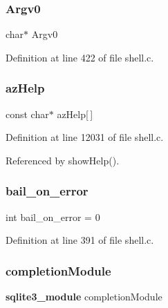 \mbox{\label{shell_8c_ad906c78c2bf41002f903352c505b780f}} 
\subsubsection{Argv0}
{\footnotesize\ttfamily char$\ast$ Argv0\hspace{0.3cm}{\ttfamily [static]}}



Definition at line 422 of file shell.\+c.

\mbox{\label{shell_8c_ad3947fa1f0ba643fbcbdf0daefbe3dd6}} 
\subsubsection{az\+Help}
{\footnotesize\ttfamily const char$\ast$ az\+Help[$\,$]\hspace{0.3cm}{\ttfamily [static]}}



Definition at line 12031 of file shell.\+c.



Referenced by show\+Help().

\mbox{\label{shell_8c_a09cacd62c349d6713656bb6eaafe996d}} 
\subsubsection{bail\+\_\+on\+\_\+error}
{\footnotesize\ttfamily int bail\+\_\+on\+\_\+error = 0\hspace{0.3cm}{\ttfamily [static]}}



Definition at line 391 of file shell.\+c.

\mbox{\label{shell_8c_a5cc662469b950b9fb2a19ecd7398e99b}} 
\subsubsection{completion\+Module}
{\footnotesize\ttfamily \textbf{ sqlite3\+\_\+module} completion\+Module\hspace{0.3cm}{\ttfamily [static]}}

